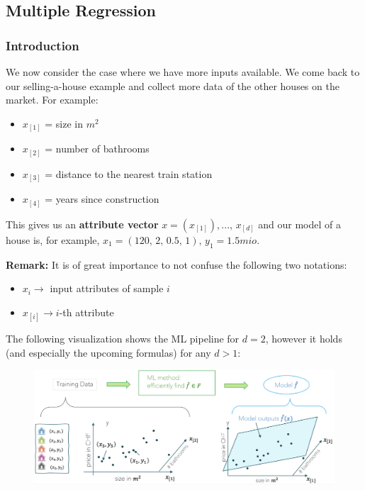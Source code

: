 \documentclass[a4paper]{extarticle}
\begin{document}
\subsection{Multiple Regression}

\subsubsection{Introduction}

We now consider the case where we have more inputs available. We come back to our selling-a-house example and collect more data of the other houses on the market. For example:

\begin{itemize}
	\item \(x_{[1]}\) = size in \(m^2\)
	\item \(x_{[2]}\) = number of bathrooms
	\item \(x_{[3]}\) = distance to the nearest train station
	\item \(x_{[4]}\) = years since construction
\end{itemize}

This gives us an \textbf{attribute vector} \(x = (x_{[1]}),..., \, x_{[d]}\) and our model of a house is, for example, \(x_1 = (120, \, 2, \, 0.5, \, 1), \, y_1 = 1.5mio\).

\begin{ebox}
	\textbf{Remark:} It is of great importance to not confuse the following two notations:

	\begin{itemize}
		\item \(x_i \rightarrow\) input attributes of sample \(i\)
		\item \(x_{[i]} \rightarrow i\)-th attribute
	\end{itemize}
\end{ebox}

The following visualization shows the ML pipeline for \(d = 2\), however it holds (and especially the upcoming formulas) for any \(d > 1\):

\begin{figure}[H]
	\includegraphics[width = 15cm]{../images/IntroML_Fig1-7}
	\centering
\end{figure}
\end{document}
